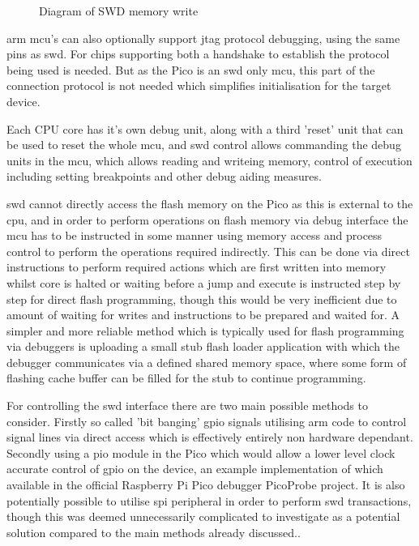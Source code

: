 {\begin{figure}[ht]
	\centering
	\caption{Diagram of SWD memory write\cite{ARMDebugInterface}}
	\label{fig:armswdwrite}
\end{figure}

\gls{arm} \gls{mcu}'s can also optionally support \gls{jtag} protocol debugging, using the same pins as \gls{swd}. For chips supporting both a handshake to establish the protocol being used is needed. But as the Pico is an \gls{swd} only \gls{mcu}, this part of the connection protocol is not needed which simplifies initialisation for the target device.

Each CPU core has it's own debug unit, along with a third 'reset' unit that can be used to reset the whole \gls{mcu}, and \gls{swd} control allows commanding the debug units in the \gls{mcu}, which allows reading and writeing memory, control of execution including setting breakpoints and other debug aiding measures.

\gls{swd} cannot directly access the flash memory on the Pico as this is external to the \gls{cpu}, and in order to perform operations on flash memory via debug interface the \gls{mcu} has to be instructed in some manner using memory access and process control to perform the operations required indirectly. This can be done via direct instructions to perform required actions which are first written into memory whilst core is halted or waiting before a jump and execute is instructed step by step for direct flash programming, though this would be very inefficient due to amount of waiting for writes and instructions to be prepared and waited for. A simpler and more reliable method which is typically used for flash programming via debuggers is uploading a small stub flash loader application with which the debugger communicates via a defined shared memory space, where some form of flashing cache buffer can be filled for the stub to continue programming.

For controlling the \gls{swd} interface there are two main possible methods to consider. Firstly so called 'bit banging' \gls{gpio} signals utilising \gls{arm} code to control signal lines via direct access which is effectively entirely non hardware dependant. Secondly using a \gls{pio} module in the Pico which would allow a lower level clock accurate control of \gls{gpio} on the device, an example implementation of which available in the official Raspberry Pi Pico debugger PicoProbe project\cite{Picoprobe2023}. It is also potentially possible to utilise \gls{spi} peripheral in order to perform \gls{swd} transactions, though this was deemed unnecessarily complicated to investigate as a potential solution compared to the main methods already discussed.\cite{OpenOCDRaspberryPi}.

}
